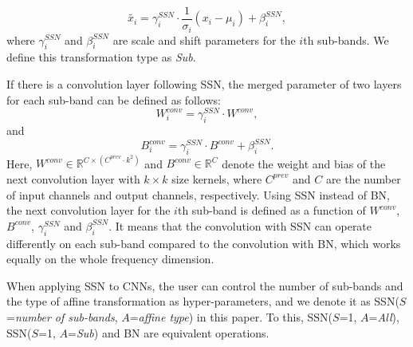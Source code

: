 \documentclass{article}
\newcommand{\R}{\mathbb{R}}
\begin{document}
\begin{equation}
    \tilde{x_i} = \gamma^{SSN}_i\cdot\frac{1}{\sigma_i} (x_i - \mu_i) + \beta^{SSN}_i,
\label{eq:ssnorm_sub}
\end{equation}
where $\gamma^{SSN}_i$ and $\beta^{SSN}_i$ are scale and shift parameters for the $i$th sub-bands. We define this transformation type as \textit{Sub}.

If there is a convolution layer following SSN, the merged parameter of two layers for each sub-band can be defined as follows:
\begin{equation}
    W^{conv}_i = \gamma^{SSN}_i \cdot W^{conv},
\label{eq:conv_w}
\end{equation}
and
\begin{equation}
    B^{conv}_i = \gamma^{SSN}_i \cdot B^{conv} + \beta^{SSN}_i.
\label{eq:conv_b}
\end{equation}
Here, $W^{conv}\in \R^{C \times (C^{prev} \cdot k^2)}$ and $B^{conv}\in \R^{C}$ denote the weight and bias of the next convolution layer with $k\times k$ size kernels, where $C^{prev}$ and $C$ are the number of input channels and output channels, respectively.
Using SSN instead of BN, the next convolution layer for the $i$th sub-band is defined as a function of $W^{conv}$, $B^{conv}$, $\gamma^{SSN}_i$ and $\beta^{SSN}_i$. It means that the convolution with SSN can operate differently on each sub-band compared to the convolution with BN, which works equally on the whole frequency dimension.

When applying SSN to CNNs, the user can control the number of sub-bands and the type of affine transformation as hyper-parameters, and we denote it as SSN($S$=\textit{number of sub-bands}, $A$=\textit{affine type}) in this paper. To this, SSN($S$=1, $A$=\textit{All}), SSN($S$=1, $A$=\textit{Sub}) and BN are equivalent operations.





\begin{table}[t]
\caption{Results on TAU Urban Acoustic Scenes 2019.
}
\vskip 0.1in
\label{tab:dcase2019}
\end{table}
\end{document}

